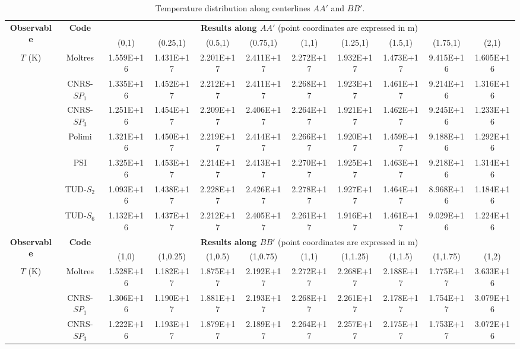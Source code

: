 \documentclass[letterpaper,11pt]{article}
\begin{document}
\begin{table}[htbp!]
	\caption{Temperature distribution along centerlines $AA'$ and $BB'$.}
	\centering
	\footnotesize
	\setlength\tabcolsep{1.5pt}
	\begin{tabular}{c c c c c c c c c c c}
		\toprule
		\multirow{2}{*}{\textbf{Observable}} & \multirow{2}{*}{\textbf{Code}} & \multicolumn{9}{c}{\textbf{Results along $AA'$} (point coordinates are expressed in m)} \\
		& & {(0,1)} & {(0.25,1)} & {(0.5,1)} & {(0.75,1)} & {(1,1)} & {(1.25,1)} & {(1.5,1)} & {(1.75,1)} & {(2,1)} \\
		\midrule
		\multirow{7}{*}{$T$ (K)} & Moltres & 1.559E+16 & 1.431E+17 & 2.201E+17 & 2.411E+17 & 2.272E+17 & 1.932E+17 & 1.473E+17 & 9.415E+16 & 1.605E+16 \\
		& CNRS-$SP_1$ & 1.335E+16 & 1.452E+17 & 2.212E+17 & 2.411E+17 & 2.268E+17 & 1.923E+17 & 1.461E+17 & 9.214E+16 & 1.316E+16 \\
		& CNRS-$SP_3$ & 1.251E+16 & 1.454E+17 & 2.209E+17 & 2.406E+17 & 2.264E+17 & 1.921E+17 & 1.462E+17 & 9.245E+16 & 1.233E+16 \\
		& Polimi & 1.321E+16 & 1.450E+17 & 2.219E+17 & 2.414E+17 & 2.266E+17 & 1.920E+17 & 1.459E+17 & 9.188E+16 & 1.292E+16 \\
		& PSI & 1.325E+16 & 1.453E+17 & 2.214E+17 & 2.413E+17 & 2.270E+17 & 1.925E+17 & 1.463E+17 & 9.218E+16 & 1.314E+16 \\
		& TUD-$S_2$ & 1.093E+16 & 1.438E+17 & 2.228E+17 & 2.426E+17 & 2.278E+17 & 1.927E+17 & 1.464E+17 & 8.968E+16 & 1.184E+16 \\
		& TUD-$S_6$ & 1.132E+16 & 1.437E+17 & 2.212E+17 & 2.405E+17 & 2.261E+17 & 1.916E+17 & 1.461E+17 & 9.029E+16 & 1.224E+16 \\
		\midrule
		\midrule
		\multirow{2}{*}{\textbf{Observable}} & \multirow{2}{*}{\textbf{Code}} & \multicolumn{9}{c}{\textbf{Results along $BB'$} (point coordinates are expressed in m)} \\
		& & {(1,0)} & {(1,0.25)} & {(1,0.5)} & {(1,0.75)} & {(1,1)} & {(1,1.25)} & {(1,1.5)} & {(1,1.75)} & {(1,2)} \\
		\midrule
		\multirow{7}{*}{$T$ (K)} & Moltres & 1.528E+16 & 1.182E+17 & 1.875E+17 & 2.192E+17 & 2.272E+17 & 2.268E+17 & 2.188E+17 & 1.775E+17 & 3.633E+16 \\
		& CNRS-$SP_1$ & 1.306E+16 & 1.190E+17 & 1.881E+17 & 2.193E+17 & 2.268E+17 & 2.261E+17 & 2.178E+17 & 1.754E+17 & 3.079E+16 \\
		& CNRS-$SP_3$ & 1.222E+16 & 1.193E+17 & 1.879E+17 & 2.189E+17 & 2.264E+17 & 2.257E+17 & 2.175E+17 & 1.753E+17 & 3.072E+16 \\

\end{tabular}
\end{table}
\end{document}
